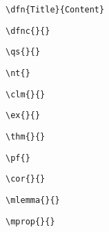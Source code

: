 \documentclass[a4paper]{report}
\begin{document}
\begin{verbatim}
\dfn{Title}{Content}
\end{verbatim}

\begin{verbatim}
\dfnc{}{}
\end{verbatim}
\dfnc{}{}

\begin{verbatim}
\qs{}{}
\end{verbatim}
\qs{}{}

\begin{verbatim}
\nt{}
\end{verbatim}
\nt{}

\begin{verbatim}
\clm{}{}
\end{verbatim}
\clm{}{}

\begin{verbatim}
\ex{}{}
\end{verbatim}
\ex{}{}

\begin{verbatim}
\thm{}{}
\end{verbatim}
\thm{}{}

\begin{verbatim}
\pf{}
\end{verbatim}
\pf{}

\begin{verbatim}
\cor{}{}
\end{verbatim}
\cor{}{}

\begin{verbatim}
\mlemma{}{}
\end{verbatim}
\mlemma{}{}

\begin{verbatim}
\mprop{}{}
\end{verbatim}
\mprop{}{}
\end{document}
